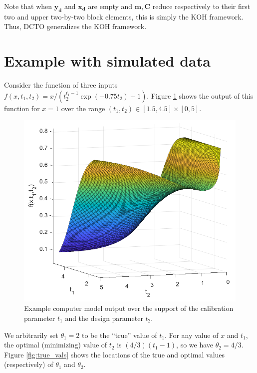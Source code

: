 \documentclass[12pt]{article}
\begin{document}
%
Note that when $\mathbf{y_d}$ and $\mathbf{x_d}$ are empty and $\mathbf m, \mathbf C$ reduce respectively to their first two and upper two-by-two block elements, this is simply the KOH framework.
%
Thus, DCTO generalizes the KOH framework.
%

%
\section{Example with simulated data}
%
Consider the function of three inputs $f(x,t_1,t_2) = x / (t_2^{t_1-1}\exp(-0.75t_2)+1)$. 
%
Figure \ref{fig:example_output} shows the output of this function for $x=1$ over the range $(t_1,t_2)\in[1.5,4.5]\times[0,5]$.
%
\begin{figure}
\centering
\includegraphics[scale=0.85]{FIG_obj_fn}
\captionsetup{width=.85\linewidth}
\caption{Example computer model output over the support of the calibration parameter $t_1$ and the design parameter $t_2$.}
\label{fig:example_output}
\end{figure}
%
We arbitrarily set $\theta_1=2$ to be the ``true'' value of $t_1$.
%
For any value of $x$ and $t_1$, the optimal (minimizing) value of $t_2$ is $(4/3)(t_1-1)$, so we have $\theta_2=4/3.$
%
Figure \ref{fig:true_vals} shows the locations of the true and optimal values (respectively) of $\theta_1$ and $\theta_2$.
%
\end{document}
